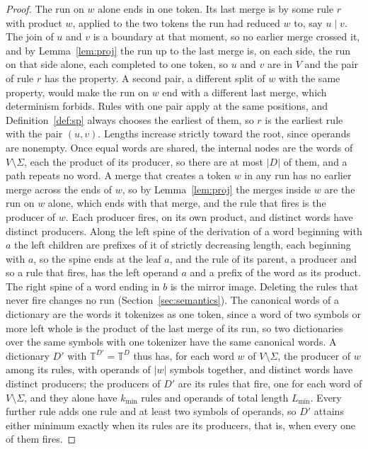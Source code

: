 \documentclass[11pt,a4paper]{article}
\theoremstyle{definition}
\theoremstyle{plain}
\newcommand{\T}{\mathbb{T}}
\begin{document}
\begin{proof}
The run on \(w\) alone ends in one token. Its last merge is by some rule \(r\) with product \(w\), applied to the two
tokens the run had reduced \(w\) to, say \(u \mid v\). The join of \(u\) and \(v\) is a boundary at that moment, so no
earlier merge crossed it, and by Lemma~\ref{lem:proj} the run up to the last merge is, on each side, the run on that
side alone, each completed to one token, so \(u\) and \(v\) are in \(V\) and the pair of rule \(r\) has the property. A
second pair, a different split of \(w\) with the same property, would make the run on \(w\) end with a different last
merge, which determinism forbids. Rules with one pair apply at the same positions, and Definition~\ref{def:sp} always
chooses the earliest of them, so \(r\) is the earliest rule with the pair \((u, v)\). Lengths increase strictly toward
the root, since operands are nonempty. Once equal words are shared, the internal nodes are the words of
\(V \setminus \Sigma\), each the product of its producer, so there are at most \(|D|\) of them, and a path repeats no
word. A merge that creates a token \(w\) in any run has no earlier merge across the ends of \(w\), so by
Lemma~\ref{lem:proj} the merges inside \(w\) are the run on \(w\) alone, which ends with that merge, and the rule that
fires is the producer of \(w\). Each producer fires, on its own product, and distinct words have distinct producers.
Along the left spine of the derivation of a word beginning with \(a\) the left children are prefixes of it of strictly
decreasing length, each beginning with \(a\), so the spine ends at the leaf \(a\), and the rule of its parent, a
producer and so a rule that fires, has the left operand \(a\) and a prefix of the word as its product. The right spine
of a word ending in \(b\) is the mirror image. Deleting the rules that never fire changes no run
(Section~\ref{sec:semantics}). The canonical words of a dictionary are the words it tokenizes as one token, since a word
of two symbols or more left whole is the product of the last merge of its run, so two dictionaries over the same symbols
with one tokenizer have the same canonical words. A dictionary \(D'\) with \(\T^{D'} = \T^D\) thus has, for each word
\(w\) of \(V \setminus \Sigma\), the producer of \(w\) among its rules, with operands of \(|w|\) symbols together, and
distinct words have distinct producers; the producers of \(D'\) are its rules that fire, one for each word of
\(V \setminus \Sigma\), and they alone have \(k_{\min}\) rules and operands of total length \(L_{\min}\). Every further
rule adds one rule and at least two symbols of operands, so \(D'\) attains either minimum exactly when its rules are its
producers, that is, when every one of them fires.
\end{proof}
\end{document}

